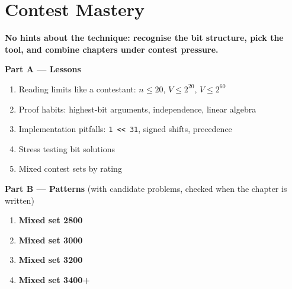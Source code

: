 \chapter{Contest Mastery}
\label{ch:mastery}

\begin{tcolorbox}[enhanced, colback=white, colframe=secondaryblue, boxrule=1pt, arc=2mm]
\textbf{\large\textcolor{primaryblue}{No hints about the technique: recognise the bit structure, pick the tool, and combine chapters under contest pressure.}}
\end{tcolorbox}


\begin{plannedbox}
\textbf{Part A --- Lessons}
\begin{enumerate}[leftmargin=*, label=\textbf{A\arabic*.}, itemsep=1pt]
    \item Reading limits like a contestant: $n \le 20$, $V \le 2^{20}$, $V \le 2^{60}$
    \item Proof habits: highest-bit arguments, independence, linear algebra
    \item Implementation pitfalls: \texttt{1 << 31}, signed shifts, precedence
    \item Stress testing bit solutions
    \item Mixed contest sets by rating
\end{enumerate}
\textbf{Part B --- Patterns} (with candidate problems, checked when the chapter is written)
\begin{enumerate}[leftmargin=*, label=\textbf{P\arabic*.}, itemsep=1pt]
    \item \textbf{Mixed set 2800}
    \item \textbf{Mixed set 3000}
    \item \textbf{Mixed set 3200}
    \item \textbf{Mixed set 3400+}
\end{enumerate}
\end{plannedbox}
